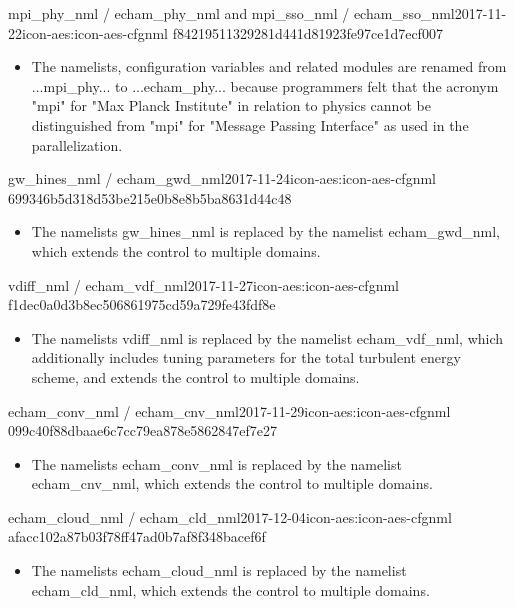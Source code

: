 \begin{changeitem}{mpi\_phy\_nml / echam\_phy\_nml and mpi\_sso\_nml / echam\_sso\_nml}{2017-11-22}{icon-aes:icon-aes-cfgnml f84219511329281d441d81923fe97ce1d7ecf007}
  \begin{itemize}
   \item The namelists, configuration variables and related modules are renamed
from ...mpi\_phy... to ...echam\_phy... because programmers felt that the acronym "mpi"  for "Max Planck Institute" in relation to physics cannot be distinguished from "mpi" for "Message Passing Interface" as used in the parallelization.
  \end{itemize}
\end{changeitem}

\begin{changeitem}{gw\_hines\_nml / echam\_gwd\_nml}{2017-11-24}{icon-aes:icon-aes-cfgnml 699346b5d318d53be215e0b8e8b5ba8631d44c48}
  \begin{itemize}
   \item The namelists gw\_hines\_nml is replaced by the namelist echam\_gwd\_nml, which extends the control to multiple domains.
  \end{itemize}
\end{changeitem}

\begin{changeitem}{vdiff\_nml / echam\_vdf\_nml}{2017-11-27}{icon-aes:icon-aes-cfgnml f1dec0a0d3b8ec506861975cd59a729fe43fdf8e}
  \begin{itemize}
   \item The namelists vdiff\_nml is replaced by the namelist echam\_vdf\_nml, which additionally includes tuning parameters for the total turbulent energy scheme, and extends the control to multiple domains.
  \end{itemize}
\end{changeitem}

\begin{changeitem}{echam\_conv\_nml / echam\_cnv\_nml}{2017-11-29}{icon-aes:icon-aes-cfgnml 099c40f88dbaae6c7cc79ea878e5862847ef7e27}
  \begin{itemize}
   \item The namelists echam\_conv\_nml is replaced by the namelist echam\_cnv\_nml, which extends the control to multiple domains.
  \end{itemize}
\end{changeitem}

\begin{changeitem}{echam\_cloud\_nml / echam\_cld\_nml}{2017-12-04}{icon-aes:icon-aes-cfgnml afacc102a87b03f78ff47ad0b7af8f348bacef6f}
  \begin{itemize}
   \item The namelists echam\_cloud\_nml is replaced by the namelist echam\_cld\_nml, which extends the control to multiple domains.
  \end{itemize}
\end{changeitem}

